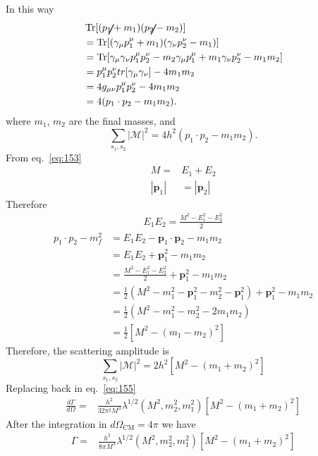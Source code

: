 In this way
\begin{align*}
&\operatorname{Tr}[(\cancel{p}_{1}+m_{1})(\cancel{p}_{2}-m_{2})]\\
&=\operatorname{Tr}[(\gamma_{\mu}p^{\mu}_{1}+m_{1})(\gamma_{\nu}p^{\nu}_{2}-m_{1})]\\
&=\operatorname{Tr}[\gamma_{\mu}\gamma_{\nu}p^{\mu}_{1}p^{\nu}_{2}-m_{2}\gamma_{\mu}p^{\mu}_{1}+m_{1}\gamma_{\nu}p^{\nu}_{2}-m_{1}m_2]\\
&=p^{\mu}_{1}p^{\nu}_{2}tr[\gamma_{\mu}\gamma_{\nu}]-4m_1 m_2\\
&=4g_{\mu\nu}p^{\mu}_{1}p^{\nu}_{2}-4m_1m_2\\
&=4(p_{1}\cdot p_{2}-m_1m_2). 
\end{align*}
where  $m_1$, $m_2$ are the final masses, and
\begin{equation*}
\sum_{s_1,s_2}|\mathcal{M}|^{2}=4h^2(p_{1}\cdot p_{2}-m_{1}m_2).
\end{equation*}
From eq.~\eqref{eq:153}
\begin{align}
  M=&E_1+E_2\nonumber\\
|\mathbf{p}_1|&=|\mathbf{p}_2|
\end{align}
Therefore
\begin{align}
  E_1E_2=\frac{M^2-E_1^2-E_2^2}{2}
\end{align}
\begin{align*}
p_{1}\cdot p_{2}-m^{2}_{f}&=E_{1}E_{2}-\mathbf{p}_{1}\cdot\mathbf{p}_{2}-m_1 m_2\\
&=E_{1}E_{2}+\mathbf{p}_{1}^2-m_1 m_2\\
&=\frac{M^2-E_1^2-E_2^2}{2}+\mathbf{p}_{1}^2-m_1 m_2\nonumber\\
&=\frac12\left(M^2-m_1^2-\mathbf{p}_1^2-m_2^2-\mathbf{p}_1^2\right)+\mathbf{p}_{1}^2-m_1 m_2\\
&=\frac12\left(M^2-m_1^2-m_2^2-2m_1m_2\right)\\
&=\frac12\left[M^2-(m_1-m_2)^2\right]
\end{align*}
Therefore, the scattering  amplitude is
\begin{equation}
\sum_{s_1,s_2}|\mathcal{M}|^{2}=2h^2\left[M^2-(m_1+m_2)^2\right]
\label{eq:82}
\end{equation}
Replacing back in eq.~\eqref{eq:155}
\begin{align}
\frac{d\Gamma}{d\Omega}=
&\frac{h^2}{32 \pi^2M^3}\lambda^{1/2}(M^2,m_2^2,m_1^2)\left[M^2-(m_1+m_2)^2\right]
\end{align}
After the integration in $d\Omega_{\text{CM}}=4\pi$ we have
\begin{align}
\Gamma=&\frac{h^2}{8 \pi M^3}\lambda^{1/2}(M^2,m_2^2,m_1^2)\left[M^2-(m_1+m_2)^2\right]
\end{align}
